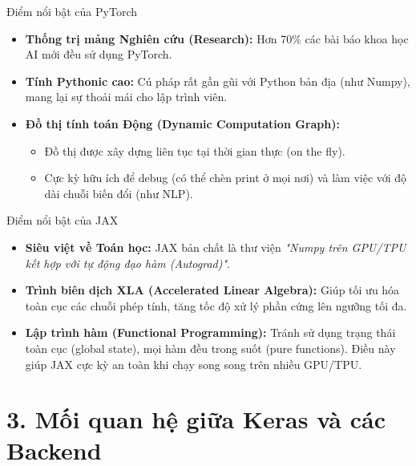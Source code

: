 \documentclass[aspectratio=169]{beamer}
\begin{document}
\begin{frame}{Điểm nổi bật của PyTorch}
    \begin{itemize}
        \item \textbf{Thống trị mảng Nghiên cứu (Research):} Hơn 70\% các bài báo khoa học AI mới đều sử dụng PyTorch.
        \item \textbf{Tính Pythonic cao:} Cú pháp rất gần gũi với Python bản địa (như Numpy), mang lại sự thoải mái cho lập trình viên.
        \item \textbf{Đồ thị tính toán Động (Dynamic Computation Graph):} 
        \begin{itemize}
            \item Đồ thị được xây dựng liên tục tại thời gian thực (on the fly).
            \item Cực kỳ hữu ích để debug (có thể chèn print ở mọi nơi) và làm việc với độ dài chuỗi biến đổi (như NLP).
        \end{itemize}
    \end{itemize}
\end{frame}

\begin{frame}{Điểm nổi bật của JAX}
    \begin{itemize}
        \item \textbf{Siêu việt về Toán học:} JAX bản chất là thư viện \textit{"Numpy trên GPU/TPU kết hợp với tự động đạo hàm (Autograd)"}.
        \item \textbf{Trình biên dịch XLA (Accelerated Linear Algebra):} Giúp tối ưu hóa toàn cục các chuỗi phép tính, tăng tốc độ xử lý phần cứng lên ngưỡng tối đa.
        \item \textbf{Lập trình hàm (Functional Programming):} Tránh sử dụng trạng thái toàn cục (global state), mọi hàm đều trong suốt (pure functions). Điều này giúp JAX cực kỳ an toàn khi chạy song song trên nhiều GPU/TPU.
    \end{itemize}
\end{frame}

\section{3. Mối quan hệ giữa Keras và các Backend}
\end{document}
